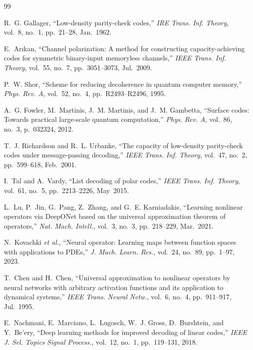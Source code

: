 ﻿\begin{thebibliography}{99}

R.~G. Gallager,
``Low-density parity-check codes,''
\textit{IRE Trans. Inf. Theory}, vol.~8, no.~1, pp.~21--28, Jan.~1962.

E.~Ar\i kan,
``Channel polarization: A method for constructing capacity-achieving codes for
symmetric binary-input memoryless channels,''
\textit{IEEE Trans. Inf. Theory}, vol.~55, no.~7, pp.~3051--3073, Jul.~2009.

P.~W. Shor,
``Scheme for reducing decoherence in quantum computer memory,''
\textit{Phys. Rev. A}, vol.~52, no.~4, pp.~R2493--R2496, 1995.

A.~G. Fowler, M.~Martinis, J.~M. Martinis, and J.~M. Gambetta,
``Surface codes: Towards practical large-scale quantum computation,''
\textit{Phys. Rev. A}, vol.~86, no.~3, p.~032324, 2012.

T.~J. Richardson and R.~L. Urbanke,
``The capacity of low-density parity-check codes under message-passing decoding,''
\textit{IEEE Trans. Inf. Theory}, vol.~47, no.~2, pp.~599--618, Feb.~2001.

I.~Tal and A.~Vardy,
``List decoding of polar codes,''
\textit{IEEE Trans. Inf. Theory}, vol.~61, no.~5, pp.~2213--2226, May~2015.

L.~Lu, P.~Jin, G.~Pang, Z.~Zhang, and G.~E. Karniadakis,
``Learning nonlinear operators via DeepONet based on the universal approximation
theorem of operators,''
\textit{Nat. Mach. Intell.}, vol.~3, no.~3, pp.~218--229, Mar.~2021.

N.~Kovachki \textit{et al.},
``Neural operator: Learning maps between function spaces with applications to PDEs,''
\textit{J. Mach. Learn. Res.}, vol.~24, no.~89, pp.~1--97, 2023.

T.~Chen and H.~Chen,
``Universal approximation to nonlinear operators by neural networks with arbitrary
activation functions and its application to dynamical systems,''
\textit{IEEE Trans. Neural Netw.}, vol.~6, no.~4, pp.~911--917, Jul.~1995.

E.~Nachmani, E.~Marciano, L.~Lugosch, W.~J. Gross, D.~Burshtein, and Y.~Be'ery,
``Deep learning methods for improved decoding of linear codes,''
\textit{IEEE J. Sel. Topics Signal Process.}, vol.~12, no.~1, pp.~119--131, 2018.


\end{thebibliography}

